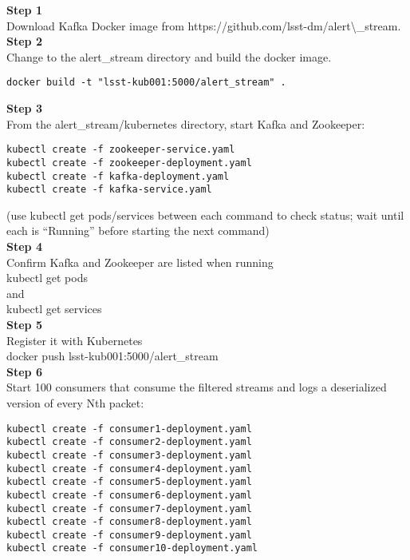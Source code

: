 \textbf{Step 1}\\
Download Kafka Docker image from
https://github.com/lsst-dm/alert\textbackslash{}\_stream.\\[2\baselineskip]\textbf{Step
2}\\
Change to the alert\_stream directory and build the docker image.\\

\begin{verbatim}
docker build -t "lsst-kub001:5000/alert_stream" .
\end{verbatim}

\textbf{Step 3}\\
From the alert\_stream/kubernetes directory, start Kafka and
Zookeeper:\\[2\baselineskip]

\begin{verbatim}
kubectl create -f zookeeper-service.yaml
kubectl create -f zookeeper-deployment.yaml
kubectl create -f kafka-deployment.yaml
kubectl create -f kafka-service.yaml
\end{verbatim}

(use kubectl get pods/services between each command to check status;
wait until each is ``Running'' before starting the next
command)\\[4\baselineskip]\textbf{Step 4}\\
Confirm Kafka and Zookeeper are listed when
running\\[2\baselineskip]kubectl get
pods\\[2\baselineskip]and\\[2\baselineskip]kubectl get
services\\[2\baselineskip]\textbf{Step 5}\\
Register it with Kubernetes\\[2\baselineskip]docker push
lsst-kub001:5000/alert\_stream\\[2\baselineskip]\textbf{Step
6}\\[2\baselineskip]Start 100 consumers that consume the filtered
streams and logs a deserialized version of every Nth
packet:\\[2\baselineskip]

\begin{verbatim}
kubectl create -f consumer1-deployment.yaml
kubectl create -f consumer2-deployment.yaml
kubectl create -f consumer3-deployment.yaml
kubectl create -f consumer4-deployment.yaml
kubectl create -f consumer5-deployment.yaml
kubectl create -f consumer6-deployment.yaml
kubectl create -f consumer7-deployment.yaml
kubectl create -f consumer8-deployment.yaml
kubectl create -f consumer9-deployment.yaml
kubectl create -f consumer10-deployment.yaml
\end{verbatim}

